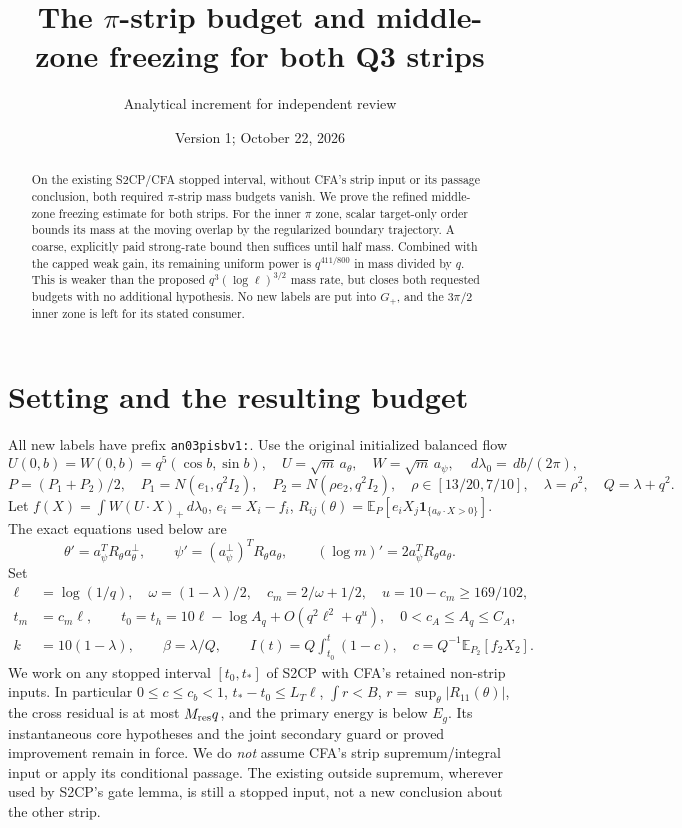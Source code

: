 \documentclass[11pt]{article}
\title{The $\pi$-strip budget and middle-zone freezing for both Q3 strips}
\author{Analytical increment for independent review}
\date{Version 1; October 22, 2026}
\numberwithin{equation}{section}
\theoremstyle{remark}\newtheorem{remark}[theorem]{Remark}
\newcommand{\E}{\mathbb E}
\newcommand{\dd}{\,d}
\newcommand{\one}{\mathbf1}
\begin{document}
\maketitle
\begin{abstract}
On the existing S2CP/CFA stopped interval, without CFA's strip input
or its passage conclusion, both required $\pi$-strip mass budgets
vanish. We prove the refined middle-zone freezing estimate for both
strips. For the inner $\pi$ zone, scalar target-only order bounds its
mass at the moving overlap by the regularized boundary trajectory.
A coarse, explicitly paid strong-rate bound then suffices until
half mass. Combined with the capped weak gain, its remaining uniform
power is $q^{411/800}$ in mass divided by $q$. This is weaker than
the proposed $q^3(\log\ell)^{3/2}$ mass rate, but closes both requested
budgets with no additional hypothesis. No new labels are put into
$G_+$, and the $3\pi/2$ inner zone is left for its stated consumer.
\end{abstract}

\section{Setting and the resulting budget}
All new labels have prefix \texttt{an03pisbv1:}.
Use the original initialized balanced flow
\[
 U(0,b)=W(0,b)=q^5(\cos b,\sin b),\quad
 U=\sqrt m\,a_\theta,\quad W=\sqrt m\,a_\psi,\quad
 \dd\lambda_0=\dd b/(2\pi),
\]
\[
 P=(P_1+P_2)/2,\quad P_1=N(e_1,q^2I_2),\quad
 P_2=N(\rho e_2,q^2I_2),\quad
 \rho\in[13/20,7/10],\quad \lambda=\rho^2,\quad Q=\lambda+q^2 .
\]
Let $f(X)=\int W(U\cdot X)_+\dd\lambda_0$, $e_i=X_i-f_i$,
$R_{ij}(\theta)=\E_P[e_iX_j\one_{\{a_\theta\cdot X>0\}}]$.
The exact equations used below are
\begin{equation}
 \theta'=a_\psi^TR_\theta a_\theta^\perp,\qquad
 \psi'=(a_\psi^\perp)^TR_\theta a_\theta,\qquad
 (\log m)'=2a_\psi^TR_\theta a_\theta .
 \label{an03pisbv1:exact}
\end{equation}
Set
\begin{align}
 \ell&=\log(1/q),\quad \omega=(1-\lambda)/2,\quad
 c_m=2/\omega+1/2,\quad u=10-c_m\ge169/102,\nonumber\\
 t_m&=c_m\ell,\qquad
 t_0=t_h=10\ell-\log A_q+O(q^2\ell^2+q^u),\quad
 0<c_A\le A_q\le C_A,\nonumber\\
 k&=10(1-\lambda),\qquad \beta=\lambda/Q,\qquad
 I(t)=Q\int_{t_0}^t(1-c),\quad
 c=Q^{-1}\E_{P_2}[f_2X_2].                       \label{an03pisbv1:scales}
\end{align}
We work on any stopped interval $[t_0,t_*]$ of S2CP with CFA's
retained non-strip inputs. In particular $0\le c\le c_b<1$,
$t_*-t_0\le L_T\ell$, $\int r<B$,
$r=\sup_\theta|R_{11}(\theta)|$, the cross residual is at most
$M_{\rm res}q$, and the primary energy is below $E_g$.
Its instantaneous core hypotheses and the joint secondary guard or
proved improvement remain in force. We do \emph{not} assume CFA's
strip supremum/integral input or apply its conditional passage.
The existing outside supremum, wherever used by S2CP's gate lemma,
is still a stopped input, not a new conclusion about the other strip.
\end{document}
